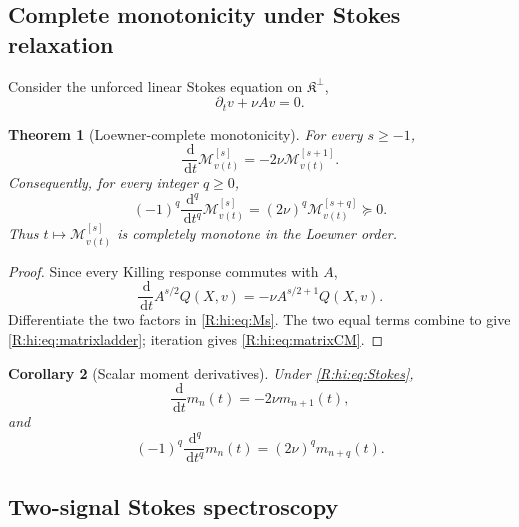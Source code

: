 \documentclass[
 aps,
 prd,
 reprint,
 amsmath,
 amssymb,
 nofootinbib,
 superscriptaddress
]{revtex4-2}
\newtheorem{theorem}{Theorem}[section]
\newtheorem{corollary}[theorem]{Corollary}
\theoremstyle{definition}
\theoremstyle{remark}
\newcommand{\cM}{\mathscr M}
\newcommand{\cK}{\mathfrak K}
\newcommand{\dd}{\,\mathrm d}
\begin{document}
\subsection{Complete monotonicity under Stokes relaxation}

Consider the unforced linear Stokes equation on $\cK^\perp$,
\begin{equation}
       \partial_tv+\nu Av=0.
       \label{R:hi:eq:Stokes}
\end{equation}

\begin{theorem}[Loewner-complete monotonicity]
\label{R:hi:thm:matrixCM}
For every $s\ge-1$,
\begin{equation}
 \boxed{
 \frac{\dd}{\dd t}
 \cM_{v(t)}^{[s]}
 =
 -2\nu
 \cM_{v(t)}^{[s+1]}.
 }
 \label{R:hi:eq:matrixladder}
\end{equation}
Consequently, for every integer $q\ge0$,
\begin{equation}
 \boxed{
 (-1)^q
 \frac{\dd^q}{\dd t^q}
 \cM_{v(t)}^{[s]}
 =
 (2\nu)^q
 \cM_{v(t)}^{[s+q]}
 \succeq0.
 }
 \label{R:hi:eq:matrixCM}
\end{equation}
Thus $t\mapsto\cM_{v(t)}^{[s]}$ is completely monotone in the Loewner
order.
\end{theorem}

\begin{proof}
Since every Killing response commutes with $A$,
\[
 \frac{\dd}{\dd t}
 A^{s/2}Q(X,v)
 =
 -\nu
 A^{s/2+1}Q(X,v).
\]
Differentiate the two factors in \eqref{R:hi:eq:Ms}.  The two equal terms combine
to give \eqref{R:hi:eq:matrixladder}; iteration gives \eqref{R:hi:eq:matrixCM}.
\end{proof}

\begin{corollary}[Scalar moment derivatives]
\label{R:hi:cor:mderivatives}
Under \eqref{R:hi:eq:Stokes},
\begin{equation}
 \frac{\dd}{\dd t}m_n(t)
 =
 -2\nu m_{n+1}(t),
 \label{R:hi:eq:mderivative}
\end{equation}
and
\begin{equation}
 (-1)^q
 \frac{\dd^q}{\dd t^q}
 m_n(t)
 =
 (2\nu)^q
 m_{n+q}(t).
 \label{R:hi:eq:scalarCM}
\end{equation}
\end{corollary}

\subsection{Two-signal Stokes spectroscopy}
\end{document}
